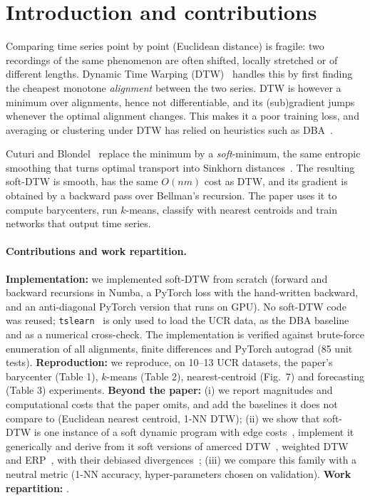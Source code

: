 \section{Introduction and contributions}

Comparing time series point by point (Euclidean distance) is fragile: two recordings of the same phenomenon are often shifted, locally stretched or of different lengths. Dynamic Time Warping (DTW)~\cite{sakoe1978dynamic} handles this by first finding the cheapest monotone \emph{alignment} between the two series. DTW is however a minimum over alignments, hence not differentiable, and its (sub)gradient jumps whenever the optimal alignment changes. This makes it a poor training loss, and averaging or clustering under DTW has relied on heuristics such as DBA~\cite{petitjean2011global}.

Cuturi and Blondel~\cite{cuturi2017soft} replace the minimum by a \emph{soft}-minimum, the same entropic smoothing that turns optimal transport into Sinkhorn distances~\cite{cuturi2013sinkhorn}. The resulting soft-DTW is smooth, has the same $O(nm)$ cost as DTW, and its gradient is obtained by a backward pass over Bellman's recursion. The paper uses it to compute barycenters, run $k$-means, classify with nearest centroids and train networks that output time series.

\paragraph{Contributions and work repartition.}
\textbf{Implementation:} we implemented soft-DTW from scratch (forward and backward recursions in Numba, a PyTorch loss with the hand-written backward, and an anti-diagonal PyTorch version that runs on GPU). No soft-DTW code was reused; \texttt{tslearn}~\cite{tavenard2020tslearn} is only used to load the UCR data, as the DBA baseline and as a numerical cross-check. The implementation is verified against brute-force enumeration of all alignments, finite differences and PyTorch autograd (85 unit tests).
\textbf{Reproduction:} we reproduce, on 10--13 UCR datasets, the paper's barycenter (Table 1), $k$-means (Table 2), nearest-centroid (Fig.~7) and forecasting (Table 3) experiments.
\textbf{Beyond the paper:} (i) we report magnitudes and computational costs that the paper omits, and add the baselines it does not compare to (Euclidean nearest centroid, 1-NN DTW); (ii) we show that soft-DTW is one instance of a soft dynamic program with edge costs~\cite{mensch2018differentiable}, implement it generically and derive from it soft versions of amerced DTW~\cite{herrmann2023amercing}, weighted DTW~\cite{jeong2011weighted} and ERP~\cite{chen2004marriage}, with their debiased divergences~\cite{blondel2021differentiable}; (iii) we compare this family with a neutral metric (1-NN accuracy, hyper-parameters chosen on validation).
\textbf{Work repartition:} .
